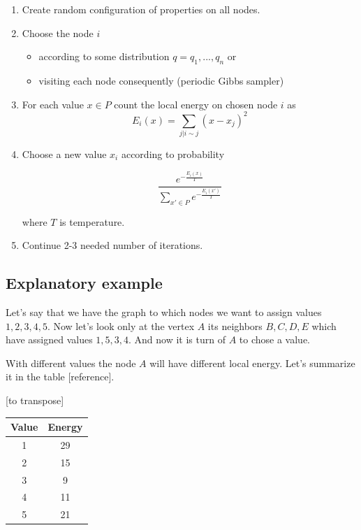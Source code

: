 \documentclass[12pt]{report}
\begin{document}
\begin{enumerate}
  \item Create random configuration of properties on all nodes.
  \item Choose the node $i$
  
 	 \begin{itemize}
		\item according to some distribution $q = q_1, ..., q_n$ or
		\item visiting each node consequently (periodic Gibbs sampler)
 	 \end{itemize}
  
  \item For each value $x \in P$ count the local energy on chosen node $i$ as 
  $$ E_i(x) = \sum\limits_{j | i \sim j}  (x - x_j)^2 $$  
  
  \item Choose a new value $x_i$ according to probability
  
  $$ \frac{ e^{-\frac{E_i(x)}{T}} }{ \sum\limits_{x'\in P} e^{-\frac{E_i(x')}{T}}} $$
  
	where $T$ is temperature.
\item Continue 2-3 needed number of iterations.
\end{enumerate}





\subsection{Explanatory example} 

Let's say that we have the graph to which nodes we want to assign values $1, 2, 3, 4, 5$. Now let's look only at the vertex $A$ its neighbors $B, C, D, E$ which have assigned values $1, 5, 3, 4$. And now it is turn of $A$ to chose a value.

With different values the node $A$ will have different local energy. Let's summarize it in the table [reference].

[to transpose]
\begin{center} \begin{tabular}{ c | c } 
	Value & Energy \\ 
	\hline 1 & 29  \\ 
	\hline 2 & 15 \\ 
	\hline 3 & 9 \\ 
	\hline 4 & 11 \\ 
	\hline 5 & 21 \\  
\end{tabular} \end{center}
\end{document}
